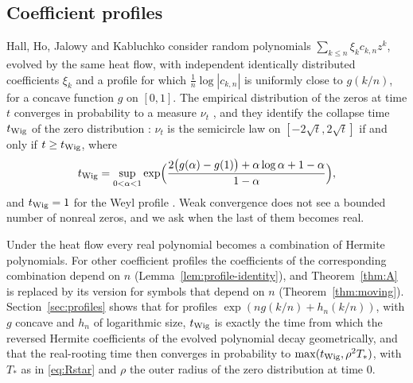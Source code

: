 \documentclass[11pt]{amsart}
\theoremstyle{definition}
\theoremstyle{remark}
\numberwithin{equation}{section}
\begin{document}
\subsection{Coefficient profiles}
Hall, Ho, Jalowy and Kabluchko \cite{HHJK} consider random polynomials $\sum_{k\le n}\xi_kc_{k,n}z^k$, evolved by the same heat flow, with independent identically distributed coefficients $\xi_k$ and a profile for which $\frac1n\log|c_{k,n}|$ is uniformly close to $g(k/n)$, for a concave function $g$ on $[0,1]$. The empirical distribution of the zeros at time $t$ converges in probability to a measure $\nu_t$ \cite[Theorem~2.6]{HHJK}, and they identify the collapse time $t_{\rm Wig}$ of the zero distribution \cite[Theorem~2.12]{HHJK}: $\nu_t$ is the semicircle law on $[-2\sqrt t,2\sqrt t]$ if and only if $t\ge t_{\rm Wig}$, where
\[
t_{\rm Wig}=\sup_{0<\alpha<1}\exp\Bigl(\frac{2\bigl(g(\alpha)-g(1)\bigr)+\alpha\log\alpha+1-\alpha}{1-\alpha}\Bigr),
\]
and $t_{\rm Wig}=1$ for the Weyl profile \cite[Example~2.13]{HHJK}. Weak convergence does not see a bounded number of nonreal zeros, and we ask when the last of them becomes real.

Under the heat flow every real polynomial becomes a combination of Hermite polynomials. For other coefficient profiles the coefficients of the corresponding combination depend on $n$ (Lemma~\ref{lem:profile-identity}), and Theorem~\ref{thm:A} is replaced by its version for symbols that depend on $n$ (Theorem~\ref{thm:moving}). Section~\ref{sec:profiles} shows that for profiles $\exp(ng(k/n)+h_n(k/n))$, with $g$ concave and $h_n$ of logarithmic size, $t_{\rm Wig}$ is exactly the time from which the reversed Hermite coefficients of the evolved polynomial decay geometrically, and that the real-rooting time then converges in probability to $\max(t_{\rm Wig},\rho^2T_*)$, with $T_*$ as in \eqref{eq:Rstar} and $\rho$ the outer radius of the zero distribution at time $0$.
\end{document}
